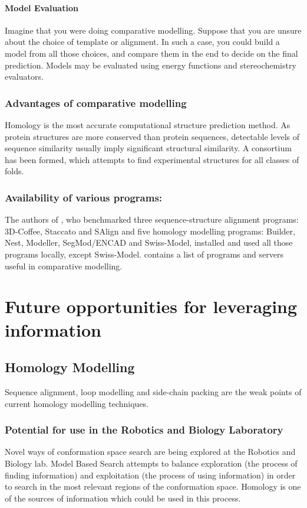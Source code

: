 \documentclass[10pt]{report}
\begin{document}
\subsubsection{Model Evaluation}

Imagine that you were doing comparative modelling. Suppose that you are unsure about the choice of template or alignment. In such a case, you could build a model from all those choices, and compare them in the end to decide on the final prediction. Models may be evaluated using energy functions and stereochemistry evaluators. \cite{marti-renom2000com}

\subsection{Advantages of comparative modelling}
Homology is the most accurate computational structure prediction method. \cite{moult05} As protein structures are more conserved than protein sequences, detectable levels of sequence similarity usually imply significant structural similarity. A consortium has been formed, which attempts to find experimental structures for all classes of folds. \cite{williamson07}

\subsection{Availability of various programs:}

The authors of \cite{dalton07}, who benchmarked three sequence-structure alignment programs: 3D-Coffee, Staccato and SAlign and five homology modelling programs: Builder, Nest, Modeller, SegMod/ENCAD and Swiss-Model, installed and used all those programs locally, except Swiss-Model. \cite{marti-renom2000com} contains a list of programs and servers useful in comparative modelling. 

\chapter{Future opportunities for leveraging information}

\section{Homology Modelling}

Sequence alignment, loop modelling and side-chain packing are the weak points of current homology modelling techniques.

\subsection{Potential  for use in the Robotics and Biology Laboratory}
Novel ways of conformation space search are being explored at the Robotics and Biology lab. Model Based Search attempts to balance exploration (the process of finding information) and exploitation (the process of using information) in order to search in the most relevant regions of the conformation space. \cite{brunette05} Homology is one of the sources of information which could be used in this process.
\end{document}
